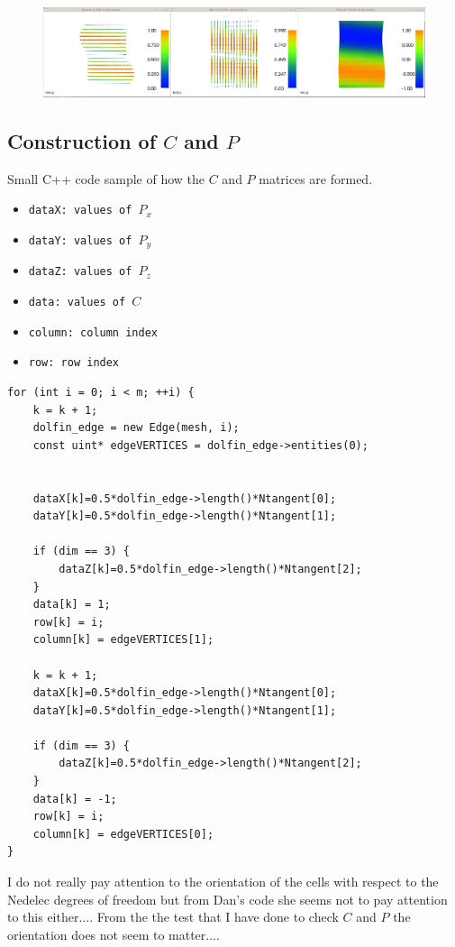 \documentclass{article}
\begin{document}
\begin{figure}[h!]
    \centering
    \includegraphics[width=1\textwidth]{Figures/Interpolation.png}
    \caption{}
    \label{fig:awesome_image}
\end{figure}



\subsection*{Construction of $C$ and $P$}

Small C++ code sample of how the $C$ and $P$ matrices are formed.
\begin{itemize}
    \item \tt{dataX}: values of $P_x$
    \item \tt{dataY}: values of $P_y$
    \item \tt{dataZ}: values of $P_z$
    \item \tt{data}: values of $C$
    \item \tt{column}: column index
    \item \tt{row}: row index
\end{itemize}
\begin{lstlisting}
for (int i = 0; i < m; ++i) {
    k = k + 1;
    dolfin_edge = new Edge(mesh, i);
    const uint* edgeVERTICES = dolfin_edge->entities(0);


    dataX[k]=0.5*dolfin_edge->length()*Ntangent[0];
    dataY[k]=0.5*dolfin_edge->length()*Ntangent[1];

    if (dim == 3) {
        dataZ[k]=0.5*dolfin_edge->length()*Ntangent[2];
    }
    data[k] = 1;
    row[k] = i;
    column[k] = edgeVERTICES[1];

    k = k + 1;
    dataX[k]=0.5*dolfin_edge->length()*Ntangent[0];
    dataY[k]=0.5*dolfin_edge->length()*Ntangent[1];

    if (dim == 3) {
        dataZ[k]=0.5*dolfin_edge->length()*Ntangent[2];
    }
    data[k] = -1;
    row[k] = i;
    column[k] = edgeVERTICES[0];
}
\end{lstlisting}

I do not really pay attention to the orientation of the cells with respect to the Nedelec degrees of freedom but from Dan's code she seems not to pay attention to this either.... From the the test that I have done to check $C$ and $P$ the orientation does not seem to matter....
\end{document}

